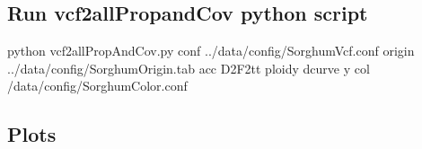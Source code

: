 \documentclass[letterpaper,10pt,english]{sphinxhowto}
\begin{document}
\subsection{Run vcf2allPropandCov python script}
\label{\detokenize{VCFHunter:run-vcf2allpropandcov-python-script}}
\begin{sphinxVerbatim}[commandchars=\\\{\}]
python vcf2allPropAndCov.py \PYGZhy{}\PYGZhy{}conf ../data/config/SorghumVcf.conf \PYGZhy{}\PYGZhy{}origin ../data/config/SorghumOrigin.tab \PYGZhy{}\PYGZhy{}acc D2\PYGZus{}F2\PYGZus{}tt \PYGZhy{}\PYGZhy{}ploidy  \PYGZhy{}\PYGZhy{}dcurve y \PYGZhy{}\PYGZhy{}col /data/config/SorghumColor.conf
\end{sphinxVerbatim}


\subsection{Plots}
\label{\detokenize{VCFHunter:plots}}
\begin{figure}[htbp]
\centering

\noindent{}
\end{figure}

\begin{figure}[htbp]
\centering

\noindent{}
\end{figure}

\begin{figure}[htbp]
\centering

\noindent{}
\end{figure}



\renewcommand{\indexname}{Index}
\printindex
\end{document}

